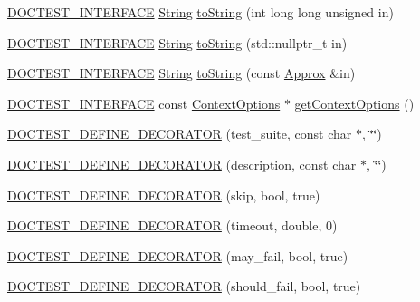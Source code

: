 \begin{DoxyCompactItemize}
\item 
\hyperlink{doctest_8h_a9c16ffc635ec47f07797d21ede26b1a5}{D\+O\+C\+T\+E\+S\+T\+\_\+\+I\+N\+T\+E\+R\+F\+A\+CE} \hyperlink{classdoctest_1_1_string}{String} \hyperlink{namespacedoctest_a0996f0f29ee1288fc2363c958fd4fd05}{to\+String} (int long long unsigned in)
\item 
\hyperlink{doctest_8h_a9c16ffc635ec47f07797d21ede26b1a5}{D\+O\+C\+T\+E\+S\+T\+\_\+\+I\+N\+T\+E\+R\+F\+A\+CE} \hyperlink{classdoctest_1_1_string}{String} \hyperlink{namespacedoctest_a88b03675f9b7b8afe5e6d4fa15117181}{to\+String} (std\+::nullptr\+\_\+t in)
\item 
\hyperlink{doctest_8h_a9c16ffc635ec47f07797d21ede26b1a5}{D\+O\+C\+T\+E\+S\+T\+\_\+\+I\+N\+T\+E\+R\+F\+A\+CE} \hyperlink{classdoctest_1_1_string}{String} \hyperlink{namespacedoctest_a63aa06a8555c5aa34a7a6e76e87a3bca}{to\+String} (const \hyperlink{classdoctest_1_1_approx}{Approx} \&in)
\item 
\hyperlink{doctest_8h_a9c16ffc635ec47f07797d21ede26b1a5}{D\+O\+C\+T\+E\+S\+T\+\_\+\+I\+N\+T\+E\+R\+F\+A\+CE} const \hyperlink{structdoctest_1_1_context_options}{Context\+Options} $\ast$ \hyperlink{namespacedoctest_a1ff2f40fd17351e182820848e27e6c79}{get\+Context\+Options} ()
\item 
\hyperlink{namespacedoctest_a104a0e533475e45acbddd9266c4d687e}{D\+O\+C\+T\+E\+S\+T\+\_\+\+D\+E\+F\+I\+N\+E\+\_\+\+D\+E\+C\+O\+R\+A\+T\+OR} (test\+\_\+suite, const char $\ast$, \char`\"{}\char`\"{})
\item 
\hyperlink{namespacedoctest_a07f4a26e2b7cce41abb7d71124951792}{D\+O\+C\+T\+E\+S\+T\+\_\+\+D\+E\+F\+I\+N\+E\+\_\+\+D\+E\+C\+O\+R\+A\+T\+OR} (description, const char $\ast$, \char`\"{}\char`\"{})
\item 
\hyperlink{namespacedoctest_a0ce903d8e37a8fdc185f6e8c73f9b1dd}{D\+O\+C\+T\+E\+S\+T\+\_\+\+D\+E\+F\+I\+N\+E\+\_\+\+D\+E\+C\+O\+R\+A\+T\+OR} (skip, bool, true)
\item 
\hyperlink{namespacedoctest_a09d01a6e97677b7bb508bf925e421963}{D\+O\+C\+T\+E\+S\+T\+\_\+\+D\+E\+F\+I\+N\+E\+\_\+\+D\+E\+C\+O\+R\+A\+T\+OR} (timeout, double, 0)
\item 
\hyperlink{namespacedoctest_a44ea7d81a1561f2222b8ffa69eecc599}{D\+O\+C\+T\+E\+S\+T\+\_\+\+D\+E\+F\+I\+N\+E\+\_\+\+D\+E\+C\+O\+R\+A\+T\+OR} (may\+\_\+fail, bool, true)
\item 
\hyperlink{namespacedoctest_a0da07f59e77fcb14943788b2c85e2355}{D\+O\+C\+T\+E\+S\+T\+\_\+\+D\+E\+F\+I\+N\+E\+\_\+\+D\+E\+C\+O\+R\+A\+T\+OR} (should\+\_\+fail, bool, true)
\item 

\end{DoxyCompactItemize}
